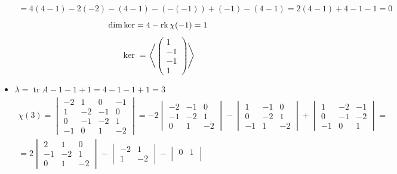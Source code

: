 \begin{itemize}
\begin{multline*}
        = 4(4 - 1) - 2(-2) - (4 - 1) - (-(-1)) + (-1) - (4 - 1) = 2(4 - 1) + 4 - 1 - 1 = 0
    \end{multline*}
    $$ \dim \ker = 4 - \operatorname{rk} \chi(-1) = 1 $$
    $$ \ker = \left\langle
    \begin{pmatrix}
        1 \\
        -1 \\
        -1 \\
        1
    \end{pmatrix} \right\rangle $$
    \item $ \lambda = \operatorname{tr}A - 1 - 1 + 1 = 4 - 1 - 1 + 1 = 3 $
    \begin{multline*}
        \chi(3) =
        \begin{vmatrix}
            -2 & 1 & 0 & -1 \\
            1 & -2 & -1 & 0 \\
            0 & -1 & -2 & 1 \\
            -1 & 0 & 1 & -2
        \end{vmatrix} = -2
        \begin{vmatrix}
        	-2 & -1 & 0 \\
            -1 & -2 & 1 \\
            0 & 1 & -2
        \end{vmatrix} -
        \begin{vmatrix}
        	1 & -1 & 0 \\
            0 & -2 & 1 \\
            -1 & 1 & -2
        \end{vmatrix} +
        \begin{vmatrix}
        	1 & -2 & -1 \\
            0 & -1 & -2 \\
            -1 & 0 & 1
        \end{vmatrix} = \\
        = 2
        \begin{vmatrix}
        	2 & 1 & 0 \\
            -1 & -2 & 1 \\
            0 & 1 & -2
        \end{vmatrix} -
        \begin{vmatrix}
        	-2 & 1 \\
            1 & -2
        \end{vmatrix} -
        \begin{vmatrix}
        	0 & 1 \\

\end{vmatrix}
\end{multline*}
\end{itemize}
